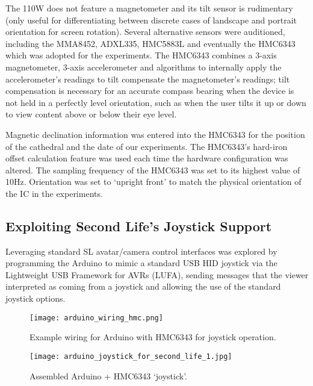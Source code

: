 The 110W does not feature a magnetometer and its tilt sensor is rudimentary (only useful for differentiating between discrete cases of landscape and portrait orientation for screen rotation). Several alternative sensors were auditioned, including the MMA8452, ADXL335, HMC5883L and eventually the HMC6343 which was adopted for the experiments. The HMC6343 combines a 3-axis magnetometer, 3-axis accelerometer and algorithms to internally apply the accelerometer's readings to tilt compensate the magnetometer's readings; tilt compensation is necessary for an accurate compass bearing when the device is not held in a perfectly level orientation, such as when the user tilts it up or down to view content above or below their eye level.

Magnetic declination information was entered into the HMC6343 for the position of the cathedral and the date of our experiments. The HMC6343's hard-iron offset calculation feature was used each time the hardware configuration was altered. The sampling frequency of the HMC6343 was set to its highest value of 10Hz. Orientation was set to `upright front' to match the physical orientation of the IC in the experiments.


\subsection{Exploiting Second Life's Joystick Support}

Leveraging standard SL avatar/camera control interfaces was explored by programming the Arduino to mimic a standard USB HID joystick via the Lightweight USB Framework for AVRs (LUFA), sending messages that the viewer interpreted as coming from a joystick and allowing the use of the standard joystick options.

\begin{figure}[h]
\centering
  \texttt{[image: arduino\_wiring\_hmc.png]}
  \caption{Example wiring for Arduino with HMC6343 for joystick operation.}
  \label{arduino_wiring_hmc.png}
\end{figure}

\begin{figure}[h]
\centering
  \texttt{[image: arduino\_joystick\_for\_second\_life\_1.jpg]}
  \caption{Assembled Arduino + HMC6343 `joystick'.}
  \label{arduino_joystick_for_second_life_1.jpg}
\end{figure}

